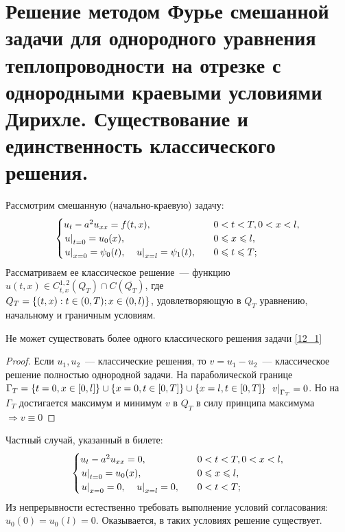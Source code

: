 \section{Решение методом Фурье смешанной задачи для однородного уравнения теплопроводности на отрезке с однородными краевыми условиями Дирихле. Существование и единственность классического решения.}
Рассмотрим смешанную (начально-краевую) задачу:
\begin{equation} \label{12_1}
	\begin{cases}
		u_t - a^2u_{xx} = f(t,x), \quad &0 < t < T, 0 < x < l, \\
		\left. u\right|_{t=0} = u_0(x), \quad & 0 \leqslant x \leqslant l, \\
		\left. u\right|_{x=0} = \psi_0(t), \quad \left. u\right|_{x=l} = \psi_1(t), \quad & 0 \leqslant t \leqslant T;
	\end{cases}
\end{equation}
Рассматриваем ее классическое решение~--- функцию $u(t,x) \in C^{1,2}_{t,x}(Q_T) \cap C(\overline{Q_T})$, где \\ $Q_T = \left\{(t,x) : t \in (0,T); x \in (0,l)\right\}$, удовлетворяющую в $Q_T$ уравнению, начальному и граничным условиям.
\begin{theorem}[Единственности]
	Не может существовать более одного классического решения задачи \ref{12_1}
\end{theorem}
\begin{proof}
	Если $u_1, u_2$~--- классические решения, то $v = u_1 - u_2$~--- классическое решение полностью однородной задачи. На параболической границе $\Gamma_T = \left\{t=0, x \in \left[0,l\right]\right\} \cup \left\{x=0, t \in \left[0,T\right]\right\} \cup \left\{x=l, t \in \left[0,T\right]\right\}$ $\left. v\right|_{\Gamma_T} = 0$. Но на $\Gamma_T$ достигается максимум и минимум $v$ в $Q_T$ в силу принципа максимума $\Rightarrow v \equiv 0$
\end{proof}

Частный случай, указанный в билете:
\begin{equation*}
	\begin{cases}
		u_t - a^2u_{xx} = 0, \quad & 0 < t < T, 0 < x < l, \\
		\left. u\right|_{t=0} = u_0(x), \quad & 0 \leqslant x \leqslant l, \\
		\left. u\right|_{x=0} = 0, \quad \left. u\right|_{x=l} = 0, \quad & 0 < t < T;
	\end{cases}
\end{equation*}
Из непрерывности естественно требовать выполнение условий согласования: $u_0(0) = u_0(l) = 0$. Оказывается, в таких условиях решение существует.

